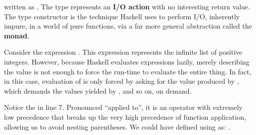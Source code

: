 \begin{notelist}
          written as \code{()}. The type  represents an \textbf{I/O action} with no interesting return
          value. The  type constructor is the technique Haskell uses to perform I/O, inherently impure,
          in a world of pure functions, via a far more general abstraction called the \textbf{monad}.
    \item Consider the expression \code{[1..]}. This expression represents the infinite list of positive
          integers. However, because Haskell evaluates expressions lazily, merely describing the value is not enough to
          force the run-time to evaluate the entire thing. In fact, in this case, evaluation of \code{[1..]} is only
          forced by  asking for the value produced by , which demands the values yielded by
          , and so on, on demand.
    \item Notice the \code{\$} in line 7. Pronounced ``applied to'', it is an operator with extremely low
          precedence that breaks up the very high precedence of function application, allowing us to avoid nesting
          parentheses. We could have defined  using \code{\$} as:
          . 
\end{notelist}

